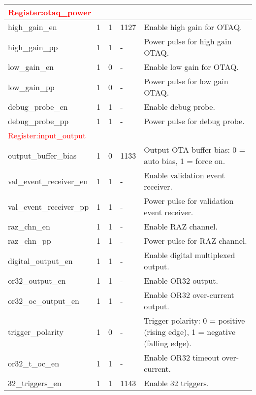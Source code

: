 \begin{longtable}{|p{6cm}|p{1cm}|p{1.4cm}|p{1.8cm}|p{5cm}|}
\multicolumn{5}{|l|}{\textcolor{red}{Register:otaq\_power}} \\ \hline
high\_gain\_en             & 1  & 1 & 1127 & Enable high gain for OTAQ. \\ \hline
high\_gain\_pp             & 1  & 1 & -    & Power pulse for high gain OTAQ. \\ \hline
low\_gain\_en              & 1  & 0 & -    & Enable low gain for OTAQ. \\ \hline
low\_gain\_pp              & 1  & 0 & -    & Power pulse for low gain OTAQ. \\ \hline
debug\_probe\_en           & 1  & 1 & -    & Enable debug probe. \\ \hline
debug\_probe\_pp           & 1  & 1 & -    & Power pulse for debug probe. \\ \hline

\multicolumn{5}{|l|}{\textcolor{red}{Register:input\_output}} \\ \hline
output\_buffer\_bias       & 1  & 0 & 1133 & Output OTA buffer bias: 0 = auto bias, 1 = force on. \\ \hline
val\_event\_receiver\_en    & 1  & 1 & -    & Enable validation event receiver. \\ \hline
val\_event\_receiver\_pp    & 1  & 1 & -    & Power pulse for validation event receiver. \\ \hline
raz\_chn\_en               & 1  & 1 & -    & Enable RAZ channel. \\ \hline
raz\_chn\_pp               & 1  & 1 & -    & Power pulse for RAZ channel. \\ \hline
digital\_output\_en        & 1  & 1 & -    & Enable digital multiplexed output. \\ \hline
or32\_output\_en           & 1  & 1 & -    & Enable OR32 output. \\ \hline
or32\_oc\_output\_en        & 1  & 1 & -    & Enable OR32 over-current output. \\ \hline
trigger\_polarity         & 1  & 0 & -    & Trigger polarity: 0 = positive (rising edge), 1 = negative (falling edge). \\ \hline
or32\_t\_oc\_en             & 1  & 1 & -    & Enable OR32 timeout over-current. \\ \hline
32\_triggers\_en           & 1  & 1 & 1143    & Enable 32 triggers. \\ \hline
\end{longtable}
\newpage
